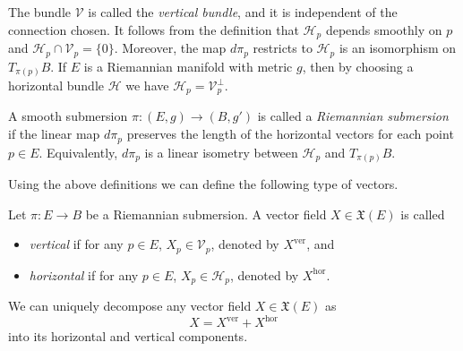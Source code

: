 \vspace{0.3cm}
\hf The bundle $\mathcal{V}$ is called the \textit{vertical bundle}, and it is independent of the connection chosen. It follows from the definition that $\mathcal{H}_p$ depends smoothly on $p$ and $\mathcal{H}_p\cap \mathcal{V}_p=\{0\}$. Moreover, the map $d\pi_p$ restricts to $\mathcal{H}_p$ is an isomorphism on $T_{\pi(p)}B$. If $E$ is a Riemannian manifold with metric $g$, then by choosing a horizontal bundle $\mathcal{H}$ we have $\mathcal{H}_p=\mathcal{V}_p^\perp$.

\begin{defn}\label{defn:Riemannian-submersion}
	 A smooth submersion $\pi:(E,g)\to (B,g')$ is called a \textit{Riemannian submersion} if the linear map $d\pi_p$ preserves the length of the horizontal vectors for each point $p\in E$. Equivalently, $d\pi_p$ is a linear isometry between $\mathcal{H}_p$ and $T_{\pi(p)}B$.
\end{defn}

\vspace{0.3cm}
\noindent Using the above definitions we can define the following type of vectors.

\begin{defn}
	Let $\pi:E\to B$ be a Riemannian submersion. A vector field $X\in \mathfrak{X}(E)$ is called
	\begin{itemize}
		\item \textit{vertical}  if for any $p\in E$, $X_p\in \mathcal{V}_p$, denoted by $X^\text{ver}$, and
		\item \textit{horizontal}  if for any $p\in E$, $X_p\in \mathcal{H}_p$, denoted by $X^\text{hor}$.
	\end{itemize}		
\end{defn}

\vspace{0.3cm}
\noindent We can uniquely decompose any vector field $X\in \mathfrak{X}(E)$ as
\begin{displaymath}
	X = X^\text{ver}+X^{\text{hor}}
\end{displaymath}
into its horizontal and vertical components.

